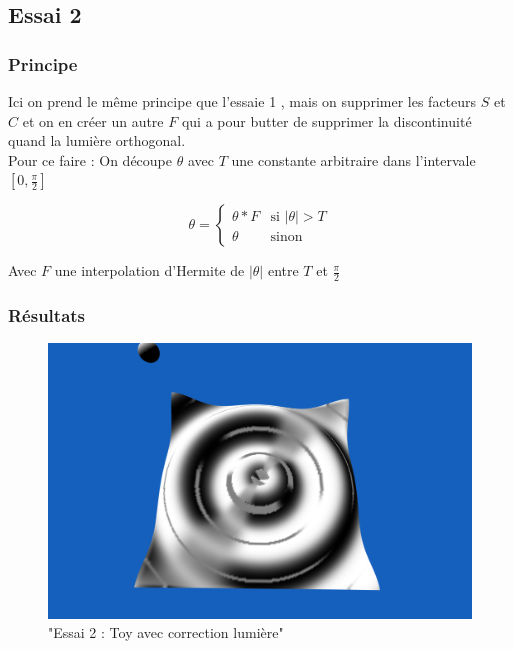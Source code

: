 \documentclass[a4paper]{article}
\begin{document}
\subsection{Essai 2}

\subsubsection{Principe}
Ici on prend le même principe que l'essaie 1 , mais on supprimer les facteurs $S$ et $C$ et on en créer un autre $F$ qui a pour butter de supprimer la discontinuité quand la lumière orthogonal.\\

Pour ce faire : On découpe $\theta$ avec $T$ une constante arbitraire dans l'intervale $[0,\frac{\pi}{2}]$



\[ \theta = 
\left\{
    \begin{array}{ll}
        \theta * F & \mbox{si } |\theta| > T \\
		\theta  & \mbox{sinon}				
    \end{array}
\right.
\]

Avec $F$ une interpolation d'Hermite de $|\theta| $ entre $T$ et $\frac{\pi}{2}$




\subsubsection{Résultats}



\begin{figure}[!h]
	\centering
    \includegraphics[scale=0.3]{Images/Essais/Essai_2_toy.png}
    \caption{"Essai 2 : Toy avec correction lumière"}
 \end{figure}
\end{document}
